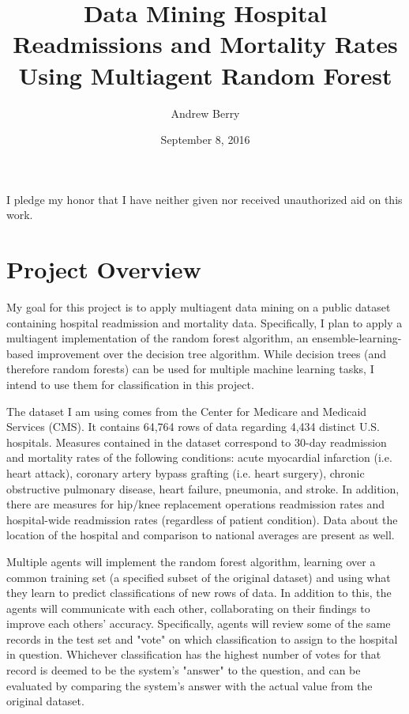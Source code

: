 \documentclass[a4paper,12pt]{article}
\author{Andrew Berry}
\title{Data Mining Hospital Readmissions and Mortality Rates Using Multiagent Random Forest}
\date{September 8, 2016}
\begin{document}
	\maketitle
I pledge my honor that I have neither given nor received unauthorized aid on this work.
\section{Project Overview}
My goal for this project is to apply multiagent data mining on a public dataset containing hospital readmission and mortality data. Specifically, I plan to apply a multiagent implementation of the random forest algorithm, an ensemble-learning-based improvement over the decision tree algorithm. While decision trees (and therefore random forests) can be used for multiple machine learning tasks, I intend to use them for classification in this project.
\par
The dataset I am using comes from the Center for Medicare and Medicaid Services (CMS). It contains 64,764 rows of data regarding 4,434 distinct U.S.  hospitals. Measures contained in the dataset correspond to 30-day readmission and mortality rates of the following conditions: acute myocardial infarction (i.e. heart attack), coronary artery bypass grafting (i.e. heart surgery), chronic obstructive pulmonary disease, heart failure, pneumonia, and stroke.  In addition, there are measures for hip/knee replacement operations readmission rates  and hospital-wide readmission rates (regardless of patient condition). Data about the location of the hospital and comparison to national averages are present as well. 
\par
Multiple agents will implement the random forest algorithm, learning over a common training set (a specified subset of the original dataset) and using what they learn to predict classifications of new rows of data. In addition to this, the agents will communicate with each other, collaborating on their findings to improve each others' accuracy. Specifically, agents will review some of the same records in the test set and "vote" on which classification to assign to the hospital in question. Whichever classification has the highest number of votes for that record is deemed to be the system's "answer" to the question, and can be evaluated by comparing the system's answer with the actual value from the original dataset.
\par
\end{document}
